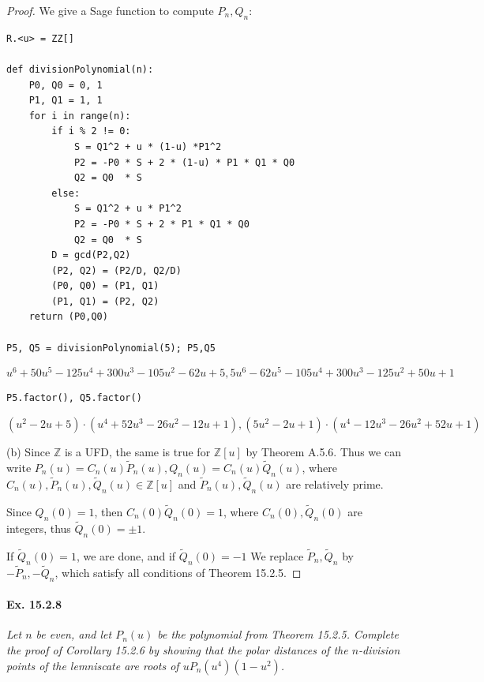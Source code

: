 \documentclass[11pt,a4paper]{article}
\newcommand{\Z}{\mathbb{Z}}
\begin{document}
\begin{proof}
\bigskip

We give a Sage function to compute $P_n,Q_n$:
\begin{verbatim}
R.<u> = ZZ[]

def divisionPolynomial(n):
    P0, Q0 = 0, 1
    P1, Q1 = 1, 1
    for i in range(n):
        if i % 2 != 0:
            S = Q1^2 + u * (1-u) *P1^2
            P2 = -P0 * S + 2 * (1-u) * P1 * Q1 * Q0
            Q2 = Q0  * S
        else:
            S = Q1^2 + u * P1^2
            P2 = -P0 * S + 2 * P1 * Q1 * Q0
            Q2 = Q0  * S
        D = gcd(P2,Q2)
        (P2, Q2) = (P2/D, Q2/D)
        (P0, Q0) = (P1, Q1)
        (P1, Q1) = (P2, Q2)
    return (P0,Q0)
    
P5, Q5 = divisionPolynomial(5); P5,Q5
\end{verbatim}
$$u^{6} + 50u^{5} - 125u^{4} + 300u^{3} - 105u^{2} - 62u + 5,  5u^{6} - 62u^{5} - 105u^{4} + 300u^{3} - 125u^{2} + 50u + 1$$
\begin{verbatim}
P5.factor(), Q5.factor()
\end{verbatim}
$$(u^{2} - 2u + 5) \cdot (u^{4} + 52u^{3} - 26u^{2} - 12u + 1), (5u^{2} - 2u + 1) \cdot (u^{4} - 12u^{3} - 26u^{2} + 52u + 1)$$

\item[(b)] 
Since $\Z$ is a UFD, the same is true for $\Z[u]$ by Theorem A.5.6.
Thus we can write $P_n(u) = C_n(u) \tilde{P}_n(u), Q_n(u) = C_n(u) \tilde{Q}_n(u)$, where $C_n(u), \tilde P_n(u),\tilde Q_n(u) \in \Z[u]$ and $\tilde P_n(u), \tilde Q_n(u)$ are relatively prime.

Since $Q_n(0) = 1$, then $C_n(0) \tilde{Q}_n(0) = 1$, where $C_n(0), \tilde{Q}_n(0)$ are integers, thus $\tilde{Q}_n(0) = \pm 1$.

If $\tilde{Q}_n(0) = 1$, we are done, and if $\tilde{Q}_n(0) = -1$ We replace $\tilde{P}_n, \tilde{Q}_n$ by $-\tilde{P}_n, - \tilde{Q}_n$, which satisfy all conditions of Theorem 15.2.5.
\end{proof}

\paragraph{Ex. 15.2.8}{\it Let $n$ be even, and let $P_n(u)$ be the polynomial from Theorem 15.2.5. Complete the proof of Corollary 15.2.6 by showing that the polar distances of the $n$-division points of the lemniscate are roots of $uP_n(u^4)(1-u^2)$.
}
\end{document}
